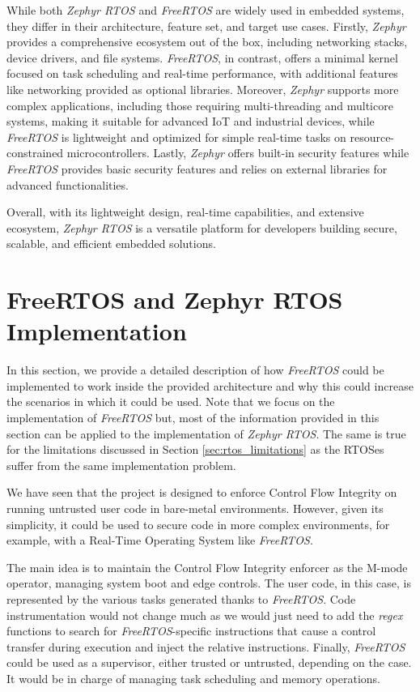 While both \textit{Zephyr RTOS} and \textit{FreeRTOS} are widely used in embedded
systems, they differ in their architecture, feature set, and target use cases. Firstly,
\textit{Zephyr} provides a comprehensive ecosystem out of the box, including
networking stacks, device drivers, and file systems. \textit{FreeRTOS}, in contrast,
offers a minimal kernel focused on task scheduling and real-time performance, with
additional features like networking provided as optional libraries. Moreover, \textit{Zephyr}
supports more complex applications, including those requiring multi-threading and
multicore systems, making it suitable for advanced IoT and industrial devices, while
\textit{FreeRTOS} is lightweight and optimized for simple real-time tasks on
resource-constrained microcontrollers. Lastly, \textit{Zephyr} offers built-in security
features while \textit{FreeRTOS} provides basic security features and relies on
external libraries for advanced functionalities.

Overall, with its lightweight design, real-time capabilities, and extensive ecosystem,
\textit{Zephyr RTOS} is a versatile platform for developers building secure,
scalable, and efficient embedded solutions.

\section{FreeRTOS and Zephyr RTOS Implementation}
\label{sec:rtos_porting}

In this section, we provide a detailed description of how \textit{FreeRTOS}
could be implemented to work inside the provided architecture and why this could
increase the scenarios in which it could be used. Note that we focus on the implementation
of \textit{FreeRTOS} but, most of the information provided in this section can be
applied to the implementation of \textit{Zephyr RTOS}. The same is true for the limitations
discussed in Section \ref{sec:rtos_limitations} as the RTOSes suffer from the same
implementation problem.

We have seen that the project is designed to enforce Control Flow Integrity on running
untrusted user code in bare-metal environments. However, given its simplicity,
it could be used to secure code in more complex environments, for example, with
a Real-Time Operating System like \textit{FreeRTOS}.

The main idea is to maintain the Control Flow Integrity enforcer as the M-mode operator,
managing system boot and edge controls. The user code, in this case, is represented
by the various tasks generated thanks to \textit{FreeRTOS}. Code instrumentation
would not change much as we would just need to add the \textit{regex} functions
to search for \textit{FreeRTOS}-specific instructions that cause a control transfer
during execution and inject the relative instructions. Finally, \textit{FreeRTOS}
could be used as a supervisor, either trusted or untrusted, depending on the
case. It would be in charge of managing task scheduling and memory operations.

